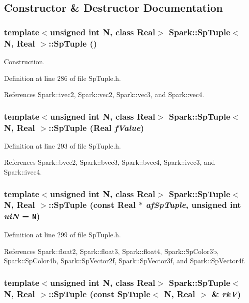 \subsection{Constructor \& Destructor Documentation}
\subsubsection{\setlength{\rightskip}{0pt plus 5cm}template$<$unsigned int N, class Real$>$ {\bf Spark::Sp\-Tuple}$<$ N, Real $>$::{\bf Sp\-Tuple} ()}\label{classSpark_1_1SpTuple_a0}


Construction. 

Definition at line 286 of file Sp\-Tuple.h.

References Spark::ivec2, Spark::vec2, Spark::vec3, and Spark::vec4.
\subsubsection{\setlength{\rightskip}{0pt plus 5cm}template$<$unsigned int N, class Real$>$ {\bf Spark::Sp\-Tuple}$<$ N, Real $>$::{\bf Sp\-Tuple} (Real {\em f\-Value})}\label{classSpark_1_1SpTuple_a1}


Definition at line 293 of file Sp\-Tuple.h.

References Spark::bvec2, Spark::bvec3, Spark::bvec4, Spark::ivec3, and Spark::ivec4.
\subsubsection{\setlength{\rightskip}{0pt plus 5cm}template$<$unsigned int N, class Real$>$ {\bf Spark::Sp\-Tuple}$<$ N, Real $>$::{\bf Sp\-Tuple} (const Real $\ast$ {\em af\-Sp\-Tuple}, unsigned int {\em ui\-N} = {\tt N})}\label{classSpark_1_1SpTuple_a2}


Definition at line 299 of file Sp\-Tuple.h.

References Spark::float2, Spark::float3, Spark::float4, Spark::Sp\-Color3b, Spark::Sp\-Color4b, Spark::Sp\-Vector2f, Spark::Sp\-Vector3f, and Spark::Sp\-Vector4f.
\subsubsection{\setlength{\rightskip}{0pt plus 5cm}template$<$unsigned int N, class Real$>$ {\bf Spark::Sp\-Tuple}$<$ N, Real $>$::{\bf Sp\-Tuple} (const {\bf Sp\-Tuple}$<$ N, Real $>$ \& {\em rk\-V})}\label{classSpark_1_1SpTuple_a3}


